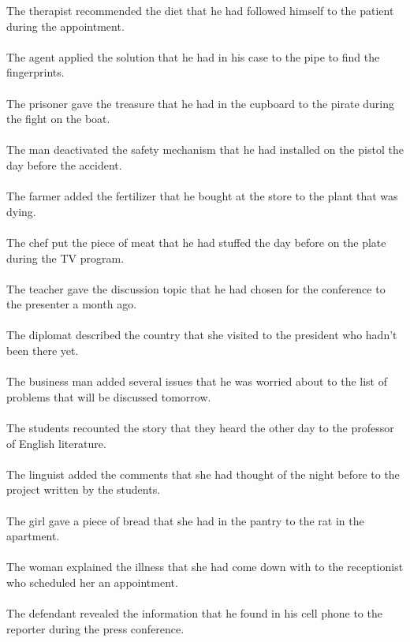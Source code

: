 The therapist recommended the diet that he had followed himself to the patient during the appointment.	\\	\\
The agent applied the solution that he had in his case to the pipe to find the fingerprints.	\\	\\
The prisoner gave the treasure that he had in the cupboard to the pirate during the fight on the boat.	\\	\\
The man deactivated the safety mechanism that he had installed on the pistol the day before the accident.	\\	\\
The farmer added the fertilizer that he bought at the store to the plant that was dying.	\\	\\
The chef put the piece of meat that he had stuffed the day before on the plate during the TV program.	\\	\\
The teacher gave the discussion topic that he had chosen for the conference to the presenter a month ago.	\\	\\
The diplomat described the country that she visited to the president who hadn't been there yet.	\\	\\
The business man added several issues that he was worried about to the list of problems that will be discussed tomorrow.	\\	\\
The students recounted the story that they heard the other day to the professor of English literature.	\\	\\
The linguist added the comments that she had thought of the night before to the project written by the students.	\\	\\
The girl gave a piece of bread that she had in the pantry to the rat in the apartment.	\\	\\
The woman explained the illness that she had come down with to the receptionist who scheduled her an appointment.	\\	\\
The defendant revealed the information that he found in his cell phone to the reporter during the press conference.	\\	\\
